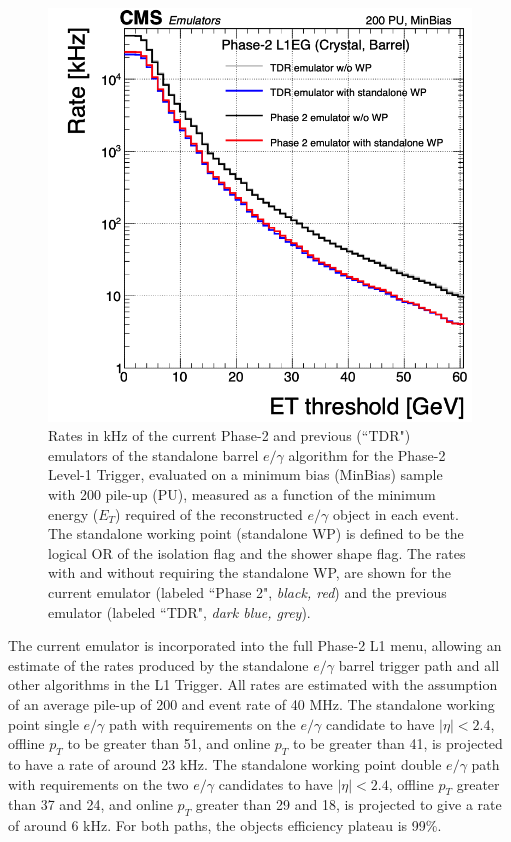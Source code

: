 \begin{figure}[h]
    \centering
    \includegraphics[width=12cm]{figures/ch-3-phase2/results-egamma-rates.png}
    \caption{Rates in kHz of the current Phase-2 and previous (``TDR") emulators of the standalone barrel $e/\gamma$ algorithm for the Phase-2 Level-1 Trigger, evaluated on a minimum bias (MinBias) sample with 200 pile-up (PU), measured as a function of the minimum energy ($E_T$) required of the reconstructed $e/\gamma$ object in each event. The standalone working point (standalone WP) is defined to be the logical OR of the isolation flag and the shower shape flag. The rates with and without requiring the standalone WP, are shown for the current emulator (labeled ``Phase 2", \textit{black, red}) and the previous emulator (labeled ``TDR", \textit{dark blue, grey}).}
    \label{fig:results-egamma-rates}
\end{figure}

The current emulator is incorporated into the full Phase-2 L1 menu, allowing an estimate of the rates produced by the standalone $e/\gamma$ barrel trigger path and all other algorithms in the L1 Trigger. All rates are estimated with the assumption of an average pile-up of 200 and event rate of 40 MHz. The standalone working point single $e/\gamma$ path with requirements on the $e/\gamma$ candidate to have $|\eta| < 2.4$, offline $p_{T}$ to be greater than 51\GeV, and online $p_{T}$ to be greater than 41\GeV, is projected to have a rate of around 23 kHz. The standalone working point double $e/\gamma$ path with requirements on the two $e/\gamma$ candidates to have $|\eta| < 2.4$, offline $p_{T}$ greater than 37 and 24\GeV, and online $p_{T}$ greater than 29 and 18\GeV, is projected to give a rate of around 6 kHz. For both paths, the objects efficiency plateau is 99\%. 
